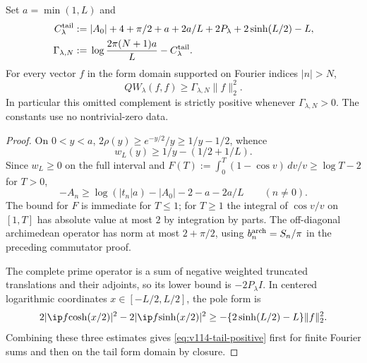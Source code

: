 \begin{proposition}
\label{prop:v114-weil-tail}
Set $a=\min(1,L)$ and
\begin{align}
 C_\lambda^{\rm tail}
 :={}&|A_0|+4+\pi/2+a+2a/L+2P_\lambda
                   +2\sinh(L/2)-L,\notag\\
 \Gamma_{\lambda,N}
 :={}&\log\frac{2\pi(N+1)a}{L}-C_\lambda^{\rm tail}.
 \label{eq:v114-tail-constant}
\end{align}
For every vector $f$ in the form domain supported on Fourier indices
$|n|>N$,
\begin{equation}\label{eq:v114-tail-positive}
 QW_\lambda(f,f)\ge\Gamma_{\lambda,N}\|f\|_2^2.
\end{equation}
In particular this omitted complement is strictly positive whenever
$\Gamma_{\lambda,N}>0$. The constants use no nontrivial-zero data.
\end{proposition}
\begin{proof}
On $0<y<a$, $2\rho(y)\ge e^{-y/2}/y\ge1/y-1/2$, whence
\[
 w_L(y)\ge1/y-(1/2+1/L).
\]
Since $w_L\ge0$ on the full interval and
$F(T):=\int_0^T(1-\cos v)\,dv/v\ge\log T-2$ for $T>0$,
\[
 -A_n\ge\log(|t_n|a)-|A_0|-2-a-2a/L\qquad(n\ne0).
\]
The bound for $F$ is immediate for $T\le1$; for $T\ge1$ the
integral of $\cos v/v$ on $[1,T]$ has absolute value at most $2$
by integration by parts. The off-diagonal archimedean operator has
norm at most $2+\pi/2$, using $b_n^{\rm arch}=S_n/\pi$ in the
preceding commutator proof.

The complete prime operator is a sum of negative weighted truncated
translations and their adjoints, so its lower bound is $-2P_\lambda I$.
In centered logarithmic coordinates $x\in[-L/2,L/2]$, the pole form is
\[
 2|\ip f{\cosh(x/2)}|^2-2|\ip f{\sinh(x/2)}|^2
 \ge-\{2\sinh(L/2)-L\}\|f\|_2^2.
\]
Combining these three estimates gives
\eqref{eq:v114-tail-positive} first for finite Fourier sums and then
on the tail form domain by closure.
\end{proof}

